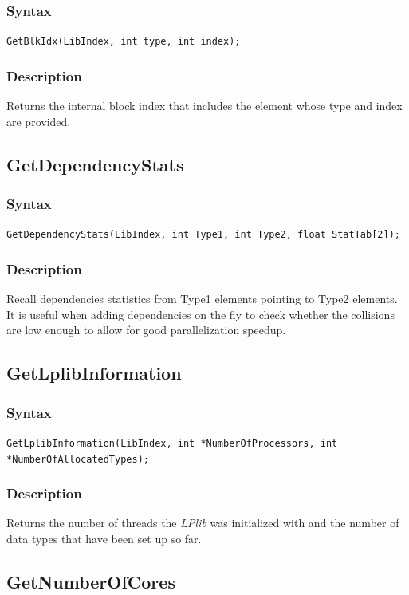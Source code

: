 \documentclass[a4paper,12pt]{article}
\begin{document}
\subsubsection*{Syntax}
\tt{GetBlkIdx(LibIndex, int type, int index);}
\normalfont

\subsubsection*{Description}
Returns the internal block index that includes the element whose type and index are provided.


\subsection{GetDependencyStats}

\subsubsection*{Syntax}
\tt{GetDependencyStats(LibIndex, int Type1, int Type2, float StatTab[2]);}
\normalfont

\subsubsection*{Description}
Recall dependencies statistics from Type1 elements pointing to Type2 elements. It is useful when adding dependencies on the fly to check whether the collisions are low enough to allow for good parallelization speedup.


\subsection{GetLplibInformation}

\subsubsection*{Syntax}
\tt{GetLplibInformation(LibIndex, int *NumberOfProcessors, int *NumberOfAllocatedTypes);}
\normalfont

\subsubsection*{Description}
Returns the number of threads the \emph{LPlib} was initialized with and the number of data types that have been set up so far.


\subsection{GetNumberOfCores}
\end{document}
